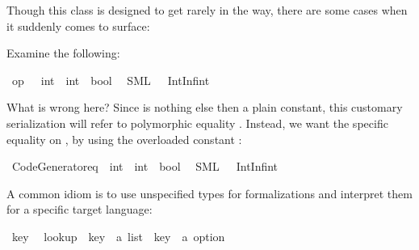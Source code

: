 \begin{isabellebody}
\begin{isamarkuptext}
  Though this class is designed to get rarely in the way, there
  are some cases when it suddenly comes to surface:%
\end{isamarkuptext}%
\isamarkuptrue%
%
\isamarkuptrue%
%
\begin{isamarkuptext}%
Examine the following:%
\end{isamarkuptext}%
\isamarkuptrue%
\isamarkupfalse%
\ {\isachardoublequoteopen}op\ {\isacharequal}\ {\isasymColon}\ int\ {\isasymRightarrow}\ int\ {\isasymRightarrow}\ bool{\isachardoublequoteclose}\isanewline
\ \ {\isacharparenleft}SML\ {\isachardoublequoteopen}{\isacharbang}{\isacharparenleft}{\isacharunderscore}\ {\isacharcolon}\ IntInf{\isachardot}int\ {\isacharequal}\ {\isacharunderscore}{\isacharparenright}{\isachardoublequoteclose}{\isacharparenright}%
\begin{isamarkuptext}%
What is wrong here? Since  is nothing else then
  a plain constant, this customary serialization will refer
  to polymorphic equality .
  Instead, we want the specific equality on ,
  by using the overloaded constant :%
\end{isamarkuptext}%
\isamarkuptrue%
\isamarkupfalse%
\ {\isachardoublequoteopen}Code{\isacharunderscore}Generator{\isachardot}eq\ {\isasymColon}\ int\ {\isasymRightarrow}\ int\ {\isasymRightarrow}\ bool{\isachardoublequoteclose}\isanewline
\ \ {\isacharparenleft}SML\ {\isachardoublequoteopen}{\isacharbang}{\isacharparenleft}{\isacharunderscore}\ {\isacharcolon}\ IntInf{\isachardot}int\ {\isacharequal}\ {\isacharunderscore}{\isacharparenright}{\isachardoublequoteclose}{\isacharparenright}%
\isamarkuptrue%
%
\begin{isamarkuptext}%
A common idiom is to use unspecified types for formalizations
  and interpret them for a specific target language:%
\end{isamarkuptext}%
\isamarkuptrue%
\isamarkupfalse%
\ key\isanewline
\isanewline
{}\isamarkupfalse%
\isanewline
\ \ lookup\ {\isacharcolon}{\isacharcolon}\ {\isachardoublequoteopen}{\isacharparenleft}key\ {\isasymtimes}\ {\isacharprime}a{\isacharparenright}\ list\ {\isasymRightarrow}\ key\ {\isasymRightarrow}\ {\isacharprime}a\ option{\isachardoublequoteclose}\ \isanewline

\end{isabellebody}
